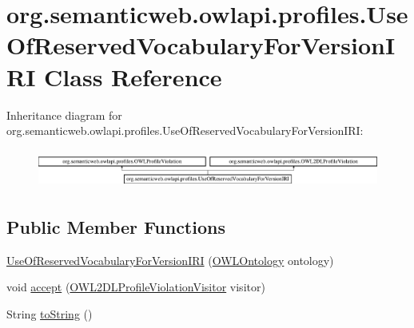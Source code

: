 \hypertarget{classorg_1_1semanticweb_1_1owlapi_1_1profiles_1_1_use_of_reserved_vocabulary_for_version_i_r_i}{\section{org.\-semanticweb.\-owlapi.\-profiles.\-Use\-Of\-Reserved\-Vocabulary\-For\-Version\-I\-R\-I Class Reference}
\label{classorg_1_1semanticweb_1_1owlapi_1_1profiles_1_1_use_of_reserved_vocabulary_for_version_i_r_i}
}
Inheritance diagram for org.\-semanticweb.\-owlapi.\-profiles.\-Use\-Of\-Reserved\-Vocabulary\-For\-Version\-I\-R\-I\-:\begin{figure}[H]
\begin{center}
\leavevmode
\includegraphics[height=1.278539cm]{classorg_1_1semanticweb_1_1owlapi_1_1profiles_1_1_use_of_reserved_vocabulary_for_version_i_r_i}
\end{center}
\end{figure}
\subsection*{Public Member Functions}
\begin{DoxyCompactItemize}
\item 
\hyperlink{classorg_1_1semanticweb_1_1owlapi_1_1profiles_1_1_use_of_reserved_vocabulary_for_version_i_r_i_a27c4732f551053082d23692fe8f5045f}{Use\-Of\-Reserved\-Vocabulary\-For\-Version\-I\-R\-I} (\hyperlink{interfaceorg_1_1semanticweb_1_1owlapi_1_1model_1_1_o_w_l_ontology}{O\-W\-L\-Ontology} ontology)
\item 
void \hyperlink{classorg_1_1semanticweb_1_1owlapi_1_1profiles_1_1_use_of_reserved_vocabulary_for_version_i_r_i_a749abdd903cd9023f7e7fbffdb90caa0}{accept} (\hyperlink{interfaceorg_1_1semanticweb_1_1owlapi_1_1profiles_1_1_o_w_l2_d_l_profile_violation_visitor}{O\-W\-L2\-D\-L\-Profile\-Violation\-Visitor} visitor)
\item 
String \hyperlink{classorg_1_1semanticweb_1_1owlapi_1_1profiles_1_1_use_of_reserved_vocabulary_for_version_i_r_i_aee4a2475b07ff0ba5e5a872e705755a1}{to\-String} ()
\end{DoxyCompactItemize}


